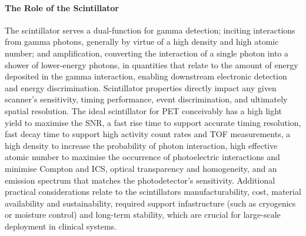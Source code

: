 \paragraph{The Role of the Scintillator}
The scintillator serves a dual-function for gamma detection; inciting interactions from gamma photons, generally by virtue of a high density and high atomic number; and amplification, converting the interaction of a single photon into a shower of lower-energy photons, in quantities that relate to the amount of energy deposited in the gamma interaction, enabling downstream electronic detection and energy discrimination.
Scintillator properties directly impact any given scanner's sensitivity, timing performance, event discrimination, and ultimately spatial resolution.
The ideal scintillator for PET conceivably has a high light yield to maximise the SNR, a fast rise time to support accurate timing resolution, fast decay time to support high activity count rates and TOF measurements, a high density to increase the probability of photon interaction, high effective atomic number to maximise the occurrence of photoelectric interactions and minimise Compton and ICS, optical transparency and homogeneity, and an emission spectrum that matches the photodetector's sensitivity.
Additional practical considerations relate to the scintillators manufacturability, cost, material availability and sustainability, required support infastructure (such as cryogenics or moisture control) and long-term stability, which are crucial for large-scale deployment in clinical systems.

